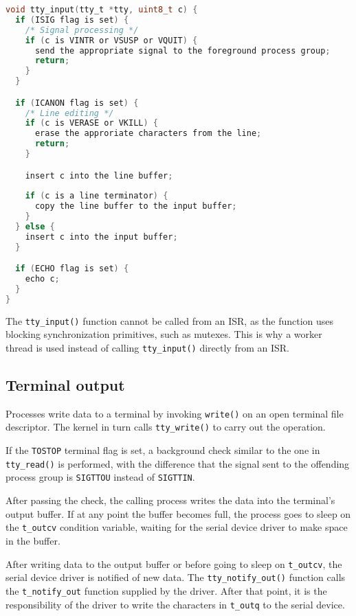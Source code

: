 \documentclass[shortabstract, manyadvisors, english, mgr]{iithesis}
\begin{document}
\noindent
\begin{minipage}{\linewidth}
\begin{lstlisting}[language=c,
caption={\texttt{kern/tty.c}: simplified control flow of \texttt{tty\_input()}.}]
void tty_input(tty_t *tty, uint8_t c) {
  if (ISIG flag is set) {
    /* Signal processing */
    if (c is VINTR or VSUSP or VQUIT) {
      send the appropriate signal to the foreground process group;
      return;
    }
  }

  if (ICANON flag is set) {
    /* Line editing */
    if (c is VERASE or VKILL) {
      erase the approriate characters from the line;
      return;
    }

    insert c into the line buffer;
    
    if (c is a line terminator) {
      copy the line buffer to the input buffer; 
    }
  } else {
    insert c into the input buffer;
  }

  if (ECHO flag is set) {
    echo c;
  }
}
\end{lstlisting}
\end{minipage}

The \texttt{tty\_input()} function cannot be called from an ISR, as the function
uses blocking synchronization primitives, such as mutexes. This is why a worker
thread is used instead of calling \texttt{tty\_input()} directly from an ISR.

\subsection{Terminal output}

Processes write data to a terminal by invoking \texttt{write()} on an open
terminal file descriptor. The kernel in turn calls \texttt{tty\_write()} to
carry out the operation.

If the \texttt{TOSTOP} terminal flag is set, a background check similar to the
one in \texttt{tty\_read()} is performed, with the difference that the signal
sent to the offending process group is \texttt{SIGTTOU} instead of
\texttt{SIGTTIN}.

After passing the check, the calling process writes the data into the terminal's
output buffer. If at any point the buffer becomes full, the process goes to
sleep on the \texttt{t\_outcv} condition variable, waiting for the serial device
driver to make space in the buffer.

After writing data to the output buffer or before going to sleep on
\texttt{t\_outcv}, the serial device driver is notified of new data. The
\texttt{tty\_notify\_out()} function calls the \texttt{t\_notify\_out} function
supplied by the driver. After that point, it is the responsibility of the driver
to write the characters in \texttt{t\_outq} to the serial device.
\end{document}
